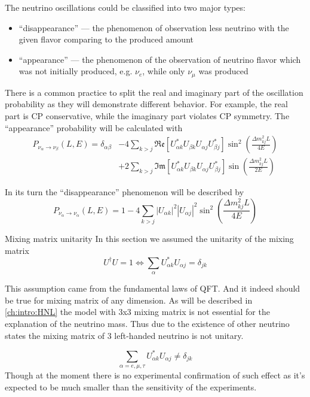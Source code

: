 \documentclass[../main.tex]{subfiles}
\begin{document}
The neutrino oscillations could be classified into two major types:
\begin{itemize}
  \item ``disappearance'' --- the phenomenon of observation less neutrino with the given flavor comparing to the produced amount
  \item ``appearance'' --- the phenomenon of the observation of neutrino flavor which was not initially produced, e.g. $\nu_e$, while only $\nu_\mu$ was produced
\end{itemize}
There is a common practice to split the real and imaginary part of the oscillation probability as they will demonstrate different behavior. For example, the real part is CP conservative, while the imaginary part violates CP symmetry. The ``appearance'' probability will be calculated with
\begin{align}
\nonumber
P_{\nu_\alpha\to\nu_\beta}(L, E)=\delta_{\alpha\beta}&-4\sum_{k>j}\mathfrak{Re}\left[U^*_{\alpha k}U_{\beta k}U_{\alpha j}U^*_{\beta j}\right]\sin^2\left(\frac{\Delta m^2_{kj}L}{4E}\right) \\
&+2\sum_{k>j}\mathfrak{Im}\left[U^*_{\alpha k}U_{\beta k}U_{\alpha j}U^*_{\beta j}\right]\sin\left(\frac{\Delta m^2_{kj}L}{2E}\right)
\label{eq:intro:app}
\end{align}

In its turn the ``disappearance'' phenomenon will be described by
\begin{equation}
\label{eq:intro:dis}
P_{\nu_\alpha\to\nu_\alpha}(L, E)=1-4\sum_{k>j}\left|U_{\alpha k}\right|^2\left|U_{\alpha j}\right|^2\sin^2\left(\frac{\Delta m^2_{kj}L}{4E}\right)
\end{equation}

\begin{bclogo}[couleur=blue!2, arrondi=0.1, logo=\bcinfo, nobreak=true]{Mixing matrix unitarity}
In this section we assumed the unitarity of the mixing matrix
\begin{equation}
U^\dag U=1 \Longleftrightarrow\sum_\alpha U^*_{\alpha k}U_{\alpha j}=\delta_{jk}
\end{equation}

This assumption came from the fundamental laws of QFT. And it indeed should be true for mixing matrix of any dimension. As will be described in \autoref{ch:intro:HNL} the model with 3x3 mixing matrix is not essential for the explanation of the neutrino mass. Thus due to the existence of other neutrino states the mixing matrix of 3 left-handed neutrino is not unitary.

\begin{equation}
\sum_{\alpha=e, \mu, \tau} U^*_{\alpha k}U_{\alpha j}\neq\delta_{jk}
\end{equation}
Though at the moment there is no experimental confirmation of such effect as it's expected to be much smaller than the sensitivity of the experiments.
\end{bclogo}
\end{document}
